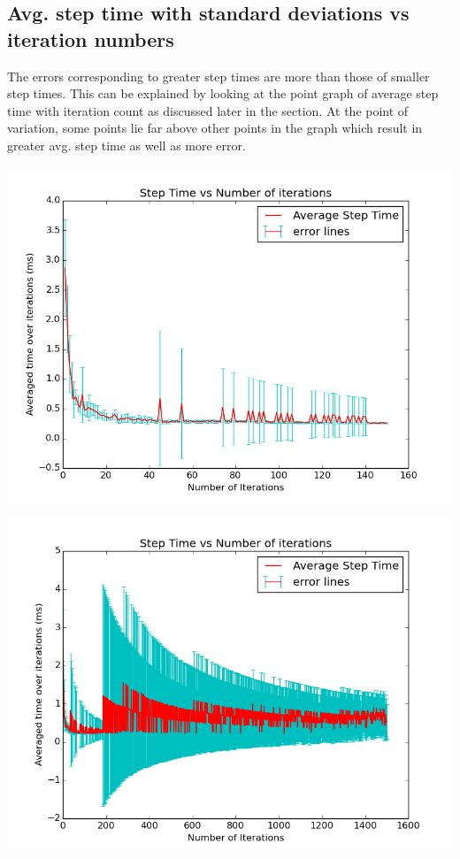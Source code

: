\documentclass[11pt]{article}
\begin{document}
	\subsection{Avg. step time with standard deviations vs iteration numbers} 
	The errors corresponding to greater step times are more than those of smaller step times. This can be explained by looking at the point graph of average 
	step time with iteration count as discussed later in the section. At the point of variation, some points lie far above other points in the graph which 
	result in greater avg. step time as well as more error.
	\begin{center}
	  \includegraphics[scale=0.5]{images/g26_plot02_150x10_even}
	\end{center}
	\begin{center}
	  \includegraphics[scale=0.5]{images/g26_plot02_1500x10_random}
	\end{center}
\end{document}
